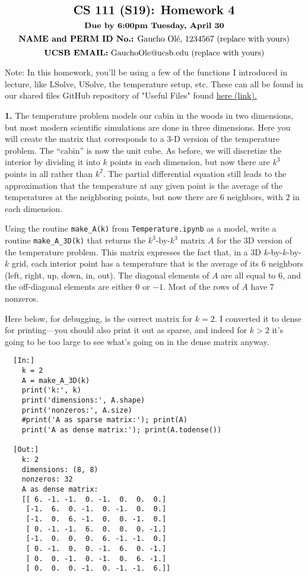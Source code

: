 \documentclass[11pt]{article}
\begin{document}
$$\mbox{\Large \textbf {CS 111 (S19): Homework 4}}$$
$$\mbox{\textbf {Due by 6:00pm Tuesday, April 30}}$$
$$\mbox{\textbf {NAME and PERM ID No.:} Gaucho Ol\'e, 1234567 (replace with yours)}$$
$$\mbox{\textbf {UCSB EMAIL:} GauchoOle@ucsb.edu (replace with yours)}$$

Note: In this homework, you'll be using a few of the functions I introduced in lecture, 
like LSolve, USolve, the temperature setup, etc. These can all be found in our shared 
files GitHub repository of "Useful Files" found
\href{https://github.com/ucsb-cs111/s19-lecture-files/tree/master/UsefulFiles}
{here (link).}

\par\bigskip
{\bf 1.}
The temperature problem models our cabin in the woods in two dimensions,
but most modern scientific simulations are done in three dimensions.
Here you will create the matrix that corresponds to a 3-D version of 
the temperature problem. The ``cabin'' is now the unit cube. As before,
we will discretize the interior by dividing it into $k$ points in each
dimension, but now there are $k^3$ points in all rather than $k^2$.
The partial differential equation still leads to the approximation
that the temperature at any given point is the average of the temperatures
at the neighboring points, but now there are 6 neighbors, 
with $2$ in each dimension.

Using the routine {\tt make\_A(k)} from {\tt Temperature.ipynb} as a model, 
write a routine {\tt make\_A\_3D(k)} that returns the $k^3$-by-$k^3$ 
matrix $A$ for the 3D version of the temperature problem.
This matrix expresses the fact that, in a 3D $k$-by-$k$-by-$k$ grid, 
each interior point has a temperature that is the average of its 6 neighbors 
(left, right, up, down, in, out).
The diagonal elements of $A$ are all equal to $6$, 
and the off-diagonal elements are either $0$ or $-1$.
Most of the rows of $A$ have 7 nonzeros.

Here below, for debugging, is the correct matrix for $k=2$.
I converted it to dense for printing---you should also
print it out as sparse, and indeed for $k>2$ it's going to be too
large to see what's going on in the dense matrix anyway.

\begin{verbatim}
  [In:]
    k = 2
    A = make_A_3D(k)
    print('k:', k)
    print('dimensions:', A.shape)
    print('nonzeros:', A.size)
    #print('A as sparse matrix:'); print(A)
    print('A as dense matrix:'); print(A.todense())

  [Out:]
    k: 2
    dimensions: (8, 8)
    nonzeros: 32
    A as dense matrix:
    [[ 6. -1. -1.  0. -1.  0.  0.  0.]
     [-1.  6.  0. -1.  0. -1.  0.  0.]
     [-1.  0.  6. -1.  0.  0. -1.  0.]
     [ 0. -1. -1.  6.  0.  0.  0. -1.]
     [-1.  0.  0.  0.  6. -1. -1.  0.]
     [ 0. -1.  0.  0. -1.  6.  0. -1.]
     [ 0.  0. -1.  0. -1.  0.  6. -1.]
     [ 0.  0.  0. -1.  0. -1. -1.  6.]]
\end{verbatim}
\end{document}
